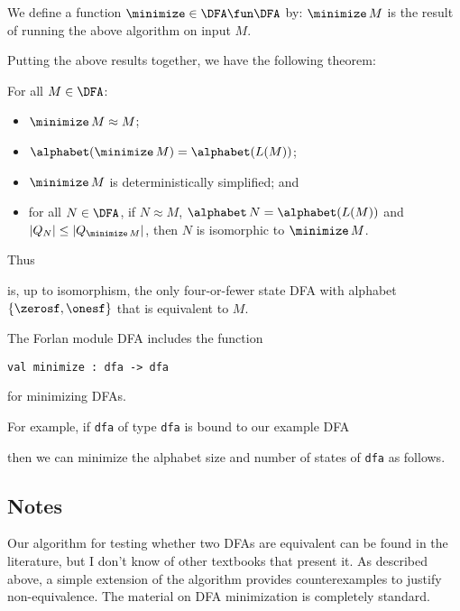 We define a function $\minimize\in\DFA\fun\DFA$ by:
$\minimize\,M$ is the result of running the above algorithm on
input $M$.

Putting the above results together, we have the following theorem:
\begin{theorem}
\label{Minimization}
For all $M\in\DFA$:
\begin{itemize}
\item $\minimize\,M\approx M$;

\item $\alphabet(\minimize\,M)=\alphabet(L(M))$;

\item $\minimize\,M$ is deterministically simplified; and

\item for all $N\in\DFA$, if $N\approx M$, $\alphabet\,N=\alphabet(L(M))$ and
$|Q_N|\leq|Q_{\minimize\,M}|$, then $N$ is isomorphic to $\minimize\,M$.
\end{itemize}
\end{theorem}

Thus
\begin{center}

\end{center}
is, up to isomorphism, the only four-or-fewer state DFA with alphabet
$\{\zerosf,\onesf\}$ that is equivalent to $M$.

The Forlan module DFA includes the function
\begin{verbatim}
val minimize : dfa -> dfa
\end{verbatim}
for minimizing DFAs.

For example, if \texttt{dfa} of type \texttt{dfa} is bound to our example
DFA
\begin{center}

\end{center}
then we can minimize the alphabet size and number of states of \texttt{dfa}
as follows.


\subsection{Notes}

Our algorithm for testing whether two DFAs are equivalent can be found
in the literature, but I don't know of other textbooks that present
it.  As described above, a simple extension of the algorithm provides
counterexamples to justify non-equivalence.  The material on DFA
minimization is completely standard.

